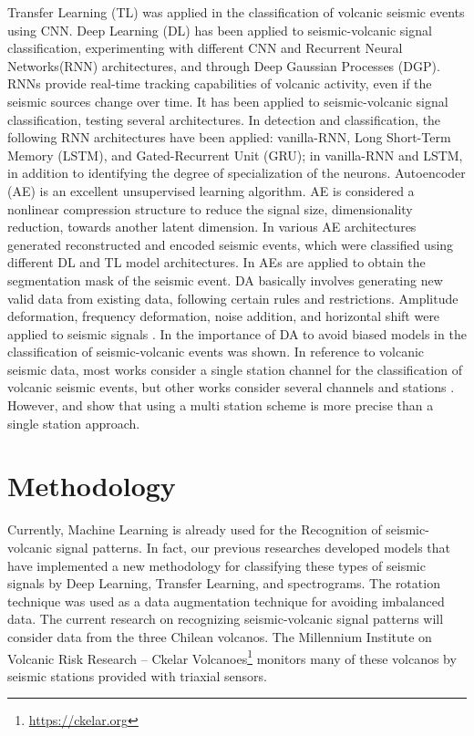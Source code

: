 \documentclass[journal]{IEEEtran}
\begin{document}
Transfer Learning (TL) was applied in the classification of volcanic seismic events using CNN\cite{mythesismaster,titos2019classification}.
Deep Learning (DL) has been applied to seismic-volcanic signal classification, experimenting with different CNN\cite{mythesismaster} and Recurrent Neural Networks(RNN) architectures\cite{salazar2020deep,ferreira2023deep,canario2020indepth}, and through Deep Gaussian Processes (DGP)\cite{lopez2020acontribution}.
RNNs provide real-time tracking capabilities of volcanic activity, even if the seismic sources change over time. It has been applied to seismic-volcanic signal classification, testing several architectures\cite{salazar2020deep}. In detection and classification, the following RNN architectures have been applied: vanilla-RNN, Long Short-Term Memory (LSTM), and Gated-Recurrent Unit (GRU)\cite{titos2018detection}; in \cite{rodriguez2021bayesian} vanilla-RNN and LSTM, in addition to identifying the degree of specialization of the neurons.
Autoencoder (AE) is an excellent unsupervised learning algorithm. AE is considered a nonlinear compression structure to reduce the signal size, dimensionality reduction, towards another latent dimension. In \cite{mythesismaster} various AE architectures generated reconstructed and encoded seismic events, which were classified using different DL and TL model architectures. In \cite{rodriguez2021bayesian} AEs are applied to obtain the segmentation mask of the seismic event.
DA basically involves generating new valid data from existing data, following certain rules and restrictions. Amplitude deformation, frequency deformation, noise addition, and horizontal shift were applied to seismic signals \cite{curilem2018using}. In \cite{salazar2022multi} the importance of DA to avoid biased models in the classification of seismic-volcanic events was shown.
In reference to volcanic seismic data, most works consider a single station channel for the classification of volcanic seismic events, but other works consider several channels and stations \cite{lara2020automatic,curilem2016pattern,maggi2017implementation,ferreira2023deep}. However, \cite{titos2019classification} and \cite{ferreira2023deep} show that using a multi station scheme is more precise than a single station approach.


\section{Methodology} \label{methodology}
Currently, Machine Learning is already used for the Recognition of seismic-volcanic signal patterns.
In fact, our previous researches developed\cite{mythesismaster,salazar2022multi} models that have implemented a new methodology for classifying these types of seismic signals by Deep Learning, Transfer Learning, and spectrograms. The rotation technique was used as a data augmentation technique for avoiding imbalanced data.
The current research on recognizing seismic-volcanic signal patterns will consider data from the three Chilean volcanos. The Millennium Institute on Volcanic Risk Research – Ckelar Volcanoes\footnote{\href{https://ckelar.org}{\color{blue}https://ckelar.org}} monitors many of these volcanos by seismic stations provided with triaxial sensors.
\end{document}
